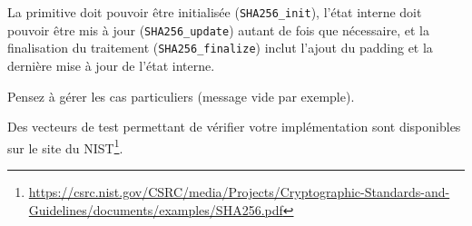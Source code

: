 \documentclass[french,a4paper,11pt]{exam}
\begin{document}
	La primitive doit pouvoir être initialisée (\texttt{SHA256\_init}), l'état interne doit pouvoir être mis à jour (\texttt{SHA256\_update}) autant de fois que nécessaire, et la finalisation du traitement (\texttt{SHA256\_finalize}) inclut l'ajout du padding et la dernière mise à jour de l'état interne.

	Pensez à gérer les cas particuliers (message vide par exemple). 

	Des vecteurs de test permettant de vérifier votre implémentation sont disponibles sur le site du NIST\footnote{\url{https://csrc.nist.gov/CSRC/media/Projects/Cryptographic-Standards-and-Guidelines/documents/examples/SHA256.pdf}}.
	
	
	
	

\end{document}
